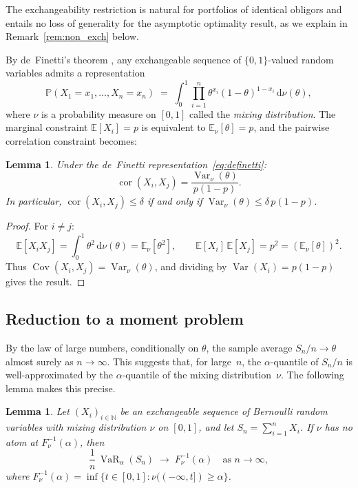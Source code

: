 \documentclass[11pt]{article}
\newtheorem{lemma}[theorem]{Lemma}
\theoremstyle{definition}
\newcommand{\dd}{\mathrm{d}}
\newcommand{\N}{\mathbb{N}}
\newcommand{\E}{\mathbb{E}}
\newcommand{\Var}{\operatorname{Var}}
\newcommand{\Cov}{\operatorname{Cov}}
\newcommand{\VaR}{\operatorname{VaR}}
\newcommand{\PP}{\mathbb{P}}
\newcommand{\1}{\mathbf{1}}
\begin{document}
The exchangeability restriction is natural for portfolios of identical obligors and entails no loss of generality for the asymptotic optimality result, as we explain in Remark~\ref{rem:non_exch} below.

By de~Finetti's theorem \citep{deFinetti1937, HewittSavage1955}, any exchangeable sequence of $\{0,1\}$-valued random variables admits a representation
\begin{equation}\label{eq:definetti}
  \PP(X_1 = x_1, \ldots, X_n = x_n) \;=\; \int_0^1 \prod_{i=1}^n \theta^{x_i}(1-\theta)^{1-x_i} \,\dd\nu(\theta),
\end{equation}
where $\nu$ is a probability measure on $[0,1]$ called the \emph{mixing distribution}. The marginal constraint $\E[X_i] = p$ is equivalent to $\E_\nu[\theta] = p$, and the pairwise correlation constraint becomes:
\begin{lemma}\label{lem:cor_mixing}
Under the de~Finetti representation~\eqref{eq:definetti}:
\begin{equation}\label{eq:cor_mixing}
  \operatorname{cor}(X_i, X_j) = \frac{\Var_\nu(\theta)}{p(1-p)}.
\end{equation}
In particular, $\operatorname{cor}(X_i, X_j) \leq \delta$ if and only if $\Var_\nu(\theta) \leq \delta\,p(1-p)$.
\end{lemma}

\begin{proof}
For $i \neq j$:
\[
  \E[X_i X_j] = \int_0^1 \theta^2 \,\dd\nu(\theta) = \E_\nu[\theta^2],
  \qquad
  \E[X_i]\,\E[X_j] = p^2 = (\E_\nu[\theta])^2.
\]
Thus $\Cov(X_i, X_j) = \Var_\nu(\theta)$, and dividing by $\Var(X_i) = p(1-p)$ gives the result.
\end{proof}

\subsection{Reduction to a moment problem}

By the law of large numbers, conditionally on $\theta$, the sample average $S_n/n \to \theta$ almost surely as $n \to \infty$. This suggests that, for large~$n$, the $\alpha$-quantile of $S_n/n$ is well-approximated by the $\alpha$-quantile of the mixing distribution~$\nu$. The following lemma makes this precise.

\begin{lemma}\label{lem:var_mixing}
Let $(X_i)_{i \in \N}$ be an exchangeable sequence of Bernoulli random variables with mixing distribution $\nu$ on $[0,1]$, and let $S_n = \sum_{i=1}^n X_i$. If $\nu$ has no atom at $F_\nu^{-1}(\alpha)$, then
\begin{equation}\label{eq:var_mixing}
  \frac{1}{n}\,\VaR_\alpha(S_n) \;\to\; F_\nu^{-1}(\alpha) \quad\text{as } n \to \infty,
\end{equation}
where $F_\nu^{-1}(\alpha) = \inf\{t \in [0,1] : \nu((-\infty, t]) \geq \alpha\}$.
\end{lemma}
\end{document}
